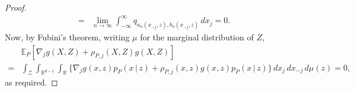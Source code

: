 \documentclass[aos]{imsart}
\newcommand{\R}{\mathbb{R}}
\newcommand{\E}{\mathbb{E}}
\newcommand{\given}{\,|\,}
\begin{document}
\begin{proof}
\begin{align*}
	=&\lim_{n \to \infty} \int_{-\infty}^\infty q_{a_n(x_{-j},z), b_n(x_{-j},z)} \, dx_j  = 0.
\end{align*}
Now, by Fubini's theorem, writing $\mu$ for the marginal distribution of $Z$,
\begin{align*}
				&\E_P[\nabla_j g(X,Z) + \rho_{P,j}(X,Z)g(X,Z)] \\
				=& \int_{\mathcal{Z}} \int_{\R^{d-1}} \int_{\R} \{ \nabla_j g(x,z)p_P(x \given  z) + \rho_{P,j}(x,z)g(x,z)p_P(x \given  z)\} \, dx_j \, dx_{-j} \, d\mu(z) =0,
\end{align*}
as required.
	\end{proof}
	
\end{document}
